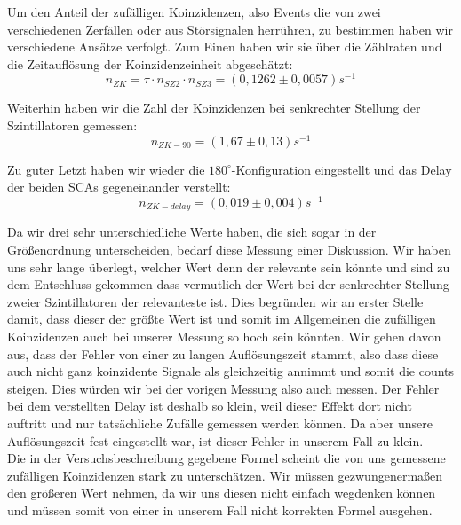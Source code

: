 Um den Anteil der zufälligen Koinzidenzen, also Events die von zwei verschiedenen Zerfällen oder aus Störsignalen herrühren, zu bestimmen haben wir verschiedene Ansätze verfolgt. Zum Einen haben wir sie über die Zählraten und die Zeitauflösung der Koinzidenzeinheit abgeschätzt:
\begin{equation*}
 n_{ZK} = \tau \cdot n_{SZ2} \cdot n_{SZ3} = (0,1262 \pm 0,0057) s^{-1}
\end{equation*}

Weiterhin haben wir die Zahl der Koinzidenzen bei senkrechter Stellung der Szintillatoren gemessen:
\begin{equation*}
 n_{ZK-90} = (1,67  \pm  0,13) s^{-1}
\end{equation*}

Zu guter Letzt haben wir wieder die $180^\circ$-Konfiguration eingestellt und das Delay der beiden SCAs gegeneinander verstellt: 
\begin{equation*}
 n_{ZK-delay} = (0,019  \pm  0,004) s^{-1}
\end{equation*}

Da wir drei sehr unterschiedliche Werte haben, die sich sogar in der Größenordnung unterscheiden, bedarf diese Messung einer Diskussion. Wir haben uns sehr lange überlegt, welcher Wert denn der relevante sein könnte und sind zu dem Entschluss gekommen dass vermutlich der Wert bei der senkrechter Stellung zweier Szintillatoren der relevanteste ist. Dies begründen wir an erster Stelle damit, dass dieser der größte Wert ist und somit im Allgemeinen die zufälligen Koinzidenzen auch bei unserer Messung so hoch sein könnten. Wir gehen davon aus, dass der Fehler von einer zu langen Auflösungszeit stammt, also dass diese auch nicht ganz koinzidente Signale als gleichzeitig annimmt und somit die counts steigen. Dies würden wir bei der vorigen Messung also auch messen. Der Fehler bei dem verstellten Delay ist deshalb so klein, weil dieser Effekt dort nicht auftritt und nur tatsächliche Zufälle gemessen werden können. Da aber unsere Auflösungszeit fest eingestellt war, ist dieser Fehler in unserem Fall zu klein. \\

Die in der Versuchsbeschreibung gegebene Formel scheint die von uns gemessene zufälligen Koinzidenzen stark zu unterschätzen. Wir müssen gezwungenermaßen den größeren Wert nehmen, da wir uns diesen nicht einfach wegdenken können und müssen somit von einer in unserem Fall nicht korrekten Formel ausgehen.
 
 

